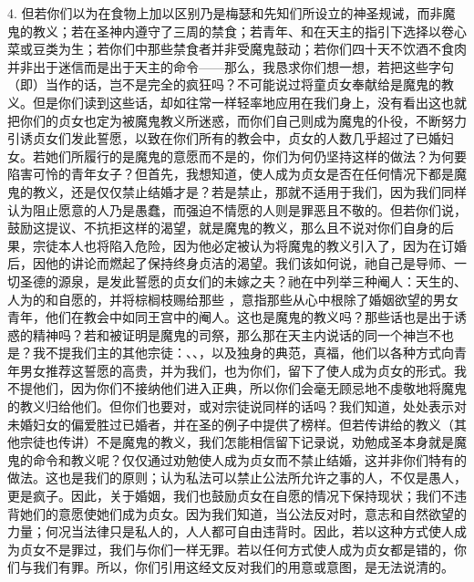 4. 但若你们以为在食物上加以区别乃是梅瑟和先知们所设立的神圣规诫，而非魔鬼的教义；若在圣神内遵守了三周的禁食；若青年、和在天主的指引下选择以卷心菜或豆类为生；若你们中那些禁食者并非受魔鬼鼓动；若你们四十天不饮酒不食肉并非出于迷信而是出于天主的命令——那么，我恳求你们想一想，若把这些字句（即）当作的话，岂不是完全的疯狂吗？不可能说过将童贞女奉献给是魔鬼的教义。但是你们读到这些话，却如往常一样轻率地应用在我们身上，没有看出这也就把你们的贞女也定为被魔鬼教义所迷惑，而你们自己则成为魔鬼的仆役，不断努力引诱贞女们发此誓愿，以致在你们所有的教会中，贞女的人数几乎超过了已婚妇女。若她们所履行的是魔鬼的意愿而不是的，你们为何仍坚持这样的做法？为何要陷害可怜的青年女子？但首先，我想知道，使人成为贞女是否在任何情况下都是魔鬼的教义，还是仅仅禁止结婚才是？若是禁止，那就不适用于我们，因为我们同样认为阻止愿意的人乃是愚蠢，而强迫不情愿的人则是罪恶且不敬的。但若你们说，鼓励这提议、不抗拒这样的渴望，就是魔鬼的教义，那么且不说对你们自身的后果，宗徒本人也将陷入危险，因为他必定被认为将魔鬼的教义引入了，因为在订婚后，因他的讲论而燃起了保持终身贞洁的渴望。我们该如何说，祂自己是导师、一切圣德的源泉，是发此誓愿的贞女们的未嫁之夫？祂在中列举三种阉人：天生的、人为的和自愿的，并将棕榈枝赐给那些 ，意指那些从心中根除了婚姻欲望的男女青年，他们在教会中如同王宫中的阉人。这也是魔鬼的教义吗？那些话也是出于诱惑的精神吗？若和被证明是魔鬼的司祭，那么那在天主内说话的同一个神岂不也是？我不提我们主的其他宗徒：、、，以及独身的典范，真福，他们以各种方式向青年男女推荐这誓愿的高贵，并为我们，也为你们，留下了使人成为贞女的形式。我不提他们，因为你们不接纳他们进入正典，所以你们会毫无顾忌地不虔敬地将魔鬼的教义归给他们。但你们也要对，或对宗徒说同样的话吗？我们知道，处处表示对未婚妇女的偏爱胜过已婚者，并在圣的例子中提供了榜样。但若传讲给的教义（其他宗徒也传讲）不是魔鬼的教义，我们怎能相信留下记录说，劝勉成圣本身就是魔鬼的命令和教义呢？仅仅通过劝勉使人成为贞女而不禁止结婚，这并非你们特有的做法。这也是我们的原则；认为私法可以禁止公法所允许之事的人，不仅是愚人，更是疯子。因此，关于婚姻，我们也鼓励贞女在自愿的情况下保持现状；我们不违背她们的意愿使她们成为贞女。因为我们知道，当公法反对时，意志和自然欲望的力量；何况当法律只是私人的，人人都可自由违背时。因此，若以这种方式使人成为贞女不是罪过，我们与你们一样无罪。若以任何方式使人成为贞女都是错的，你们与我们有罪。所以，你们引用这经文反对我们的用意或意图，是无法说清的。\par

